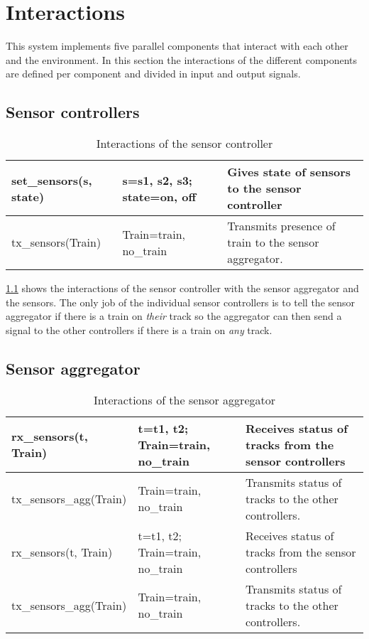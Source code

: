 \documentclass[final]{report}
\begin{document}
\chapter{Interactions}
\label{ch:interactions}
This system implements five parallel components that interact with each other and the environment.
In this section the interactions of the different components are defined per component and divided in input and output signals.

\section{Sensor controllers}
\begin{table}[H]
\centering
\begin{tabular}{|l|l|l|}
\hline
set\_sensors(s, state) & s=s1, s2, s3; state=on, off & Gives state of sensors to the sensor controller\\ \hline
tx\_sensors(Train) & Train=train, no\_train & Transmits presence of train to the sensor aggregator.\\ \hline
\end{tabular}
\caption{Interactions of the sensor controller}
\label{tab:sensorSignals}
\end{table}

\cref{tab:sensorSignals} shows the interactions of the sensor controller with the sensor aggregator and the sensors.
The only job of the individual sensor controllers is to tell the sensor aggregator if there is a train on \textit{their} track so the aggregator can then send a signal to the other controllers if there is a train on \textit{any} track.

\section{Sensor aggregator}
\begin{table}[H]
\centering
\begin{tabular}{|l|l|l|}
\hline
rx\_sensors(t, Train) & t=t1, t2; Train=train, no\_train & Receives status of tracks from the sensor controllers\\ \hline
tx\_sensors\_agg(Train) & Train=train, no\_train & Transmits status of tracks to the other controllers.\\
rx\_sensors(t, Train) & t=t1, t2; Train=train, no\_train & Receives status of tracks from the sensor controllers\\ \hline
tx\_sensors\_agg(Train) & Train=train, no\_train & Transmits status of tracks to the other controllers.\\ \hline
\end{tabular}
\caption{Interactions of the sensor aggregator}
\label{tab:sensorAggSignals}
\end{table}
\end{document}
